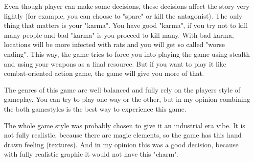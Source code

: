 \documentclass[a4paper,10pt,english]{article}
\begin{document}
Even though player can make some decisions, these decisions affect the story very lightly (for example, you can choose to "spare" or kill the antagonist). The only thing that matters is your "karma". You have good "karma", if you try not to kill many people and bad "karma" is you proceed to kill many. With bad karma, locations will be more infected with rats and you will get so called "worse ending". This way, the game tries to force you into playing the game using stealth and using your weapons as a final resource. But if you want to play it like combat-oriented action game, the game will give you more of that.\newline

The genres of this game are well balanced and fully rely on the players style of gameplay. You can try to play one way or the other, but in my opinion combining the both gamestyles is the best way to experience this game. \newline

The whole game style was probably chosen to give it an industrial era vibe. It is not fully realistic, because there are magic elements, so the game has this hand drawn feeling (textures). And in my opinion this was a good decision, because with fully realistic graphic it would not have this "charm".
\end{document}
